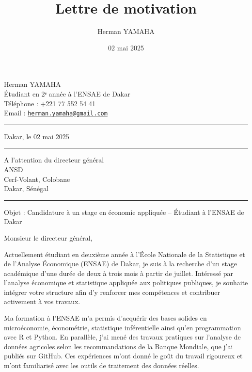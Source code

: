 \documentclass[
  13pt,
]{article}
\title{Lettre de motivation}
\author{Herman YAMAHA}
\date{02 mai 2025}
\begin{document}
\maketitle

Herman YAMAHA\\
Étudiant en 2ᵉ année à l'ENSAE de Dakar\\
Téléphone : +221 77 552 54 41\\
Email :
\href{mailto:herman.yamaha@gmail.com}{\nolinkurl{herman.yamaha@gmail.com}}

\begin{center}\rule{0.5\linewidth}{0.5pt}\end{center}

\begin{flushright}
Dakar, le 02 mai 2025  
\end{flushright}

\begin{center}\rule{0.5\linewidth}{0.5pt}\end{center}

\begin{flushright}
A l'attention du directeur général \\
              ANSD \\
   Cerf-Volant, Colobane \\
       Dakar, Sénégal
\end{flushright}

\begin{center}\rule{0.5\linewidth}{0.5pt}\end{center}

Objet : Candidature à un stage en économie appliquée -- Étudiant à
l'ENSAE de Dakar

Monsieur le directeur général,

Actuellement étudiant en deuxième année à l'École Nationale de la
Statistique et de l'Analyse Économique (ENSAE) de Dakar, je suis à la
recherche d'un stage académique d'une durée de deux à trois mois à
partir de juillet. Intéressé par l'analyse économique et statistique
appliquée aux politiques publiques, je souhaite intégrer votre structure
afin d'y renforcer mes compétences et contribuer activement à vos
travaux.

Ma formation à l'ENSAE m'a permis d'acquérir des bases solides en
microéconomie, économétrie, statistique inférentielle ainsi qu'en
programmation avec R et Python. En parallèle, j'ai mené des travaux
pratiques sur l'analyse de données agricoles selon les recommandations
de la Banque Mondiale, que j'ai publiés sur GitHub. Ces expériences
m'ont donné le goût du travail rigoureux et m'ont familiarisé avec les
outils de traitement des données réelles.
\end{document}
